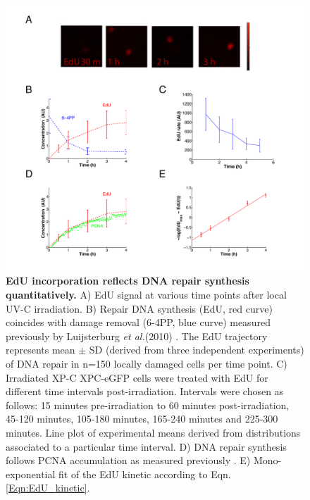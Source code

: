 %
%
%
%
\begin{figure}[b!]
\begin{center}
\includegraphics[width=1\textwidth]{Abbildungen/figure2_4.pdf}
\caption{\textbf{EdU incorporation reflects DNA repair synthesis quantitatively.} A) EdU signal at various time points after local UV-C irradiation. B) Repair DNA synthesis (EdU, red curve) coincides with damage removal (6-4PP, blue curve) measured previously by Luijsterburg \textit{et al.}(2010) \cite{Luijsterburg2010}. The EdU trajectory represents mean $\pm$ SD (derived from three independent experiments) of DNA repair in n=150 locally damaged cells per time point. C) Irradiated XP-C XPC-eGFP cells were treated with EdU for different time intervals post-irradiation. Intervals were chosen as follows: 15 minutes pre-irradiation to 60 minutes post-irradiation, 45-120 minutes, 105-180 minutes, 165-240 minutes and 225-300 minutes. Line plot of experimental means derived from distributions associated to a particular time interval. D) DNA repair synthesis follows PCNA accumulation as measured previously \cite{Luijsterburg2010}. E) Mono-exponential fit of the EdU kinetic according to Eqn. \ref{Eqn:EdU_kinetic}.}
\label{fig:DNArepairKinetic}
%
%
\end{center}
\end{figure}

